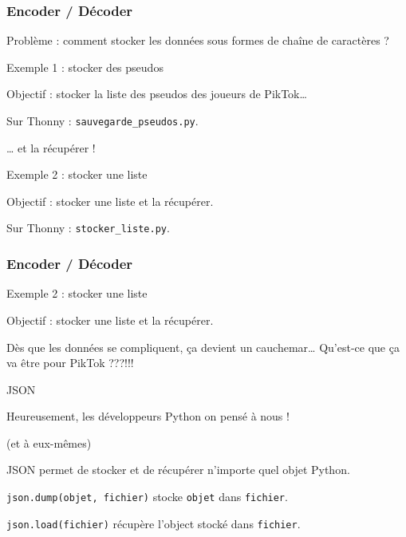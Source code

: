 \documentclass[x11names,svgnames]{beamer}
\begin{document}
\begin{frame}[fragile]
  \frametitle{Encoder / Décoder}

  Problème : comment stocker les données sous formes de chaîne de caractères ?

  \begin{exampleblock}{Exemple 1 : stocker des pseudos}
    \vspace{0pt}

    Objectif : stocker la liste des pseudos des joueurs de PikTok\dots

    \MVRightarrow{} Sur Thonny : \texttt{sauvegarde\_pseudos.py}.

    \pause \dots{} et la récupérer !

  \end{exampleblock}

  \begin{exampleblock}{Exemple 2 : stocker une liste}
    \vspace{0pt}

    Objectif : stocker une liste et la récupérer.

    \MVRightarrow{} Sur Thonny : \texttt{stocker\_liste.py}.

  \end{exampleblock}

\end{frame}

\begin{frame}[fragile]
  \frametitle{Encoder / Décoder}

  \begin{exampleblock}{Exemple 2 : stocker une liste}
    \vspace{0pt}

    Objectif : stocker une liste et la récupérer.

  \end{exampleblock}

  \MVRightarrow{} Dès que les données se compliquent, ça devient un cauchemar\dots{} Qu'est-ce que ça va être pour PikTok ???!!!

  \pause

  \begin{block}{JSON}
    \vspace{0pt}

    Heureusement, les développeurs Python on pensé à nous !

    (et à eux-mêmes)

    \MVRightArrow{} JSON permet de stocker et de récupérer n'importe quel objet Python.

    \texttt{json.dump(objet, fichier)} stocke \texttt{objet} dans \texttt{fichier}.

    \texttt{json.load(fichier)} récupère l'object stocké dans \texttt{fichier}.

  \end{block}

\end{frame}
\end{document}
